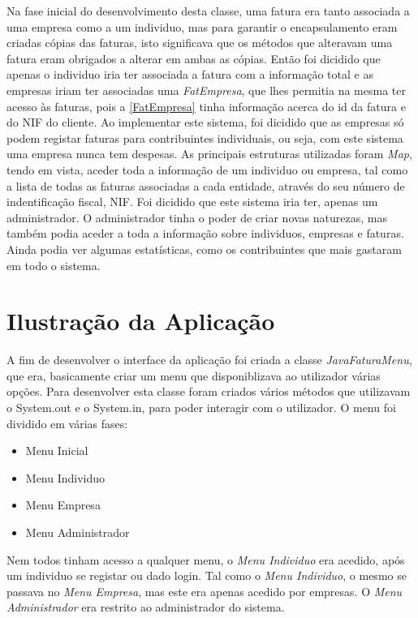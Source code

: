 \documentclass[10pt, a4paper]{report}
\begin{document}
Na fase inicial do desenvolvimento desta classe, uma fatura era tanto associada a uma empresa como a um individuo, mas para garantir o encapsulamento eram criadas cópias das faturas, isto significava que os métodos que alteravam uma fatura eram obrigados a alterar em ambas as cópias. Então foi dicidido que apenas o individuo iria ter associada a fatura com a informação total e as empresas iriam ter associadas uma \emph{FatEmpresa}, que lhes permitia na mesma ter acesso às faturas, pois a \ref{FatEmpresa} tinha informação acerca do id da fatura e do NIF do cliente. Ao implementar este sistema, foi dicidido que as empresas só podem registar faturas para contribuintes individuais, ou seja, com este sistema uma empresa nunca tem despesas.
As principais estruturas utilizadas foram \emph{Map}, tendo em vista, aceder toda a informação de um individuo ou empresa, tal como a lista de todas as faturas associadas a cada entidade, através do seu número de indentificação fiscal, NIF.
Foi dicidido que este sistema iria ter, apenas um administrador. O administrador tinha o poder de criar novas naturezas, mas também podia aceder a toda a informação sobre individuos, empresas e faturas. Ainda podia ver algumas estatísticas, como os contribuintes que mais gastaram em todo o sistema.

\chapter{Ilustração da Aplicação}

A fim de desenvolver o interface da aplicação foi criada a classe \emph{JavaFaturaMenu}, que era, basicamente criar um menu que disponiblizava ao utilizador várias opções.
Para desenvolver esta classe foram criados vários métodos que utilizavam o System.out e o System.in, para poder interagir com o utilizador.
O menu foi dividido em várias fases:

\begin{itemize}
	\item Menu Inicial
	\item Menu Individuo
	\item Menu Empresa
	\item Menu Administrador
\end{itemize}

Nem todos tinham acesso a qualquer menu, o \emph{Menu Individuo} era acedido, após um individuo se registar ou dado login.
Tal como o \emph{Menu Individuo}, o mesmo se passava no \emph{Menu Empresa}, mas este era apenas acedido por empresas.
O \emph{Menu Administrador} era restrito ao administrador do sistema.
\end{document}
